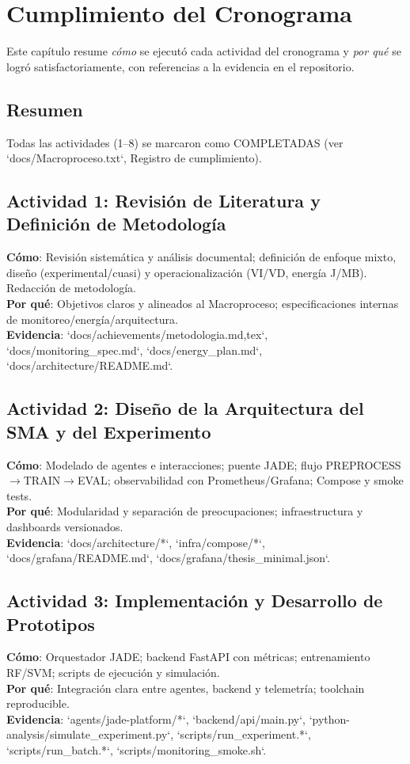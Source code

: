 \chapter{Cumplimiento del Cronograma}
\label{chap:cumplimiento-cronograma}

Este capítulo resume \textit{cómo} se ejecutó cada actividad del cronograma y \textit{por qué} se logró satisfactoriamente, con referencias a la evidencia en el repositorio.

\section*{Resumen}
Todas las actividades (1--8) se marcaron como COMPLETADAS (ver `docs/Macroproceso.txt`, Registro de cumplimiento).

\section{Actividad 1: Revisión de Literatura y Definición de Metodología}
\textbf{Cómo}: Revisión sistemática y análisis documental; definición de enfoque mixto, diseño (experimental/cuasi) y operacionalización (VI/VD, energía J/MB). Redacción de metodología.\\
\textbf{Por qué}: Objetivos claros y alineados al Macroproceso; especificaciones internas de monitoreo/energía/arquitectura.\\
\textbf{Evidencia}: `docs/achievements/metodologia.{md,tex}`, `docs/monitoring_spec.md`, `docs/energy_plan.md`, `docs/architecture/README.md`.

\section{Actividad 2: Diseño de la Arquitectura del SMA y del Experimento}
\textbf{Cómo}: Modelado de agentes e interacciones; puente JADE; flujo PREPROCESS$\to$TRAIN$\to$EVAL; observabilidad con Prometheus/Grafana; Compose y smoke tests.\\
\textbf{Por qué}: Modularidad y separación de preocupaciones; infraestructura y dashboards versionados.\\
\textbf{Evidencia}: `docs/architecture/*`, `infra/compose/*`, `docs/grafana/README.md`, `docs/grafana/thesis_minimal.json`.

\section{Actividad 3: Implementación y Desarrollo de Prototipos}
\textbf{Cómo}: Orquestador JADE; backend FastAPI con métricas; entrenamiento RF/SVM; scripts de ejecución y simulación.\\
\textbf{Por qué}: Integración clara entre agentes, backend y telemetría; toolchain reproducible.\\
\textbf{Evidencia}: `agents/jade-platform/*`, `backend/api/main.py`, `python-analysis/simulate_experiment.py`, `scripts/run_experiment.*`, `scripts/run_batch.*`, `scripts/monitoring_smoke.sh`.

